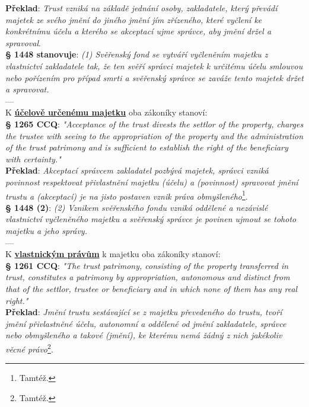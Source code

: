 \documentclass{article}
\begin{document}
\textbf{Překlad}: \textit{Trust vzniká na základě jednání osoby, zakladatele, který převádí majetek ze svého jmění do jiného jmění jím zřízeného, které vyčlení ke konkrétnímu účelu a kterého se akceptací ujme správce, aby jmění držel a spravoval}.\\

\textbf{§ 1448 stanovuje}:
\textit{(1) Svěřenský fond se vytváří vyčleněním majetku z vlastnictví zakladatele tak, že ten svěří správci majetek k určitému účelu smlouvou nebo pořízením pro případ smrti a svěřenský správce se zaváže tento majetek držet a spravovat.}\\

---\\

K \textbf{\underline{účelově určenému majetku}} oba zákoníky stanoví:\\

\textbf{§ 1265 CCQ}: \textit{"Acceptance of the trust divests the settlor of the property, charges the trustee with seeing to the appropriation of the property and the administration of the trust patrimony and is sufficient to establish the right of the beneficiary with certainty."}\\

\textbf{Překlad}: \textit{Akceptací správcem zakladatel pozbývá majetek, správci vzniká povinnost respektovat přivlastnění majetku (účelu) a (povinnost) spravovat jmění trustu a (akceptací) je na jisto postaven vznik práva obmyšleného}\footnote{Tamtéž.}.\\

\textbf{§ 1448 (2)}:
\textit{(2) Vznikem svěřenského fondu vzniká oddělené a nezávislé vlastnictví vyčleněného majetku a svěřenský správce je povinen ujmout se tohoto majetku a jeho správy.}\\

---\\

K \textbf{\underline{vlastnickým právům}} k majetku oba zákoníky stanoví:\\

\textbf{§ 1261 CCQ}: \textit{"The trust patrimony, consisting of the property transferred in trust, constitutes a patrimony by appropriation, autonomous and distinct from that of the settlor, trustee or beneficiary and in which none of them has any real right."}\\

\textbf{Překlad}: \textit{Jmění trustu sestávající se z majetku převedeného do trustu, tvoří jmění přivlastněné účelu, autonomní a oddělené od jmění zakladatele, správce nebo obmyšleného a takové (jmění), ke kterému nemá žádný z nich jakékoliv věcné právo}\footnote{Tamtéž.}.\\
\end{document}

